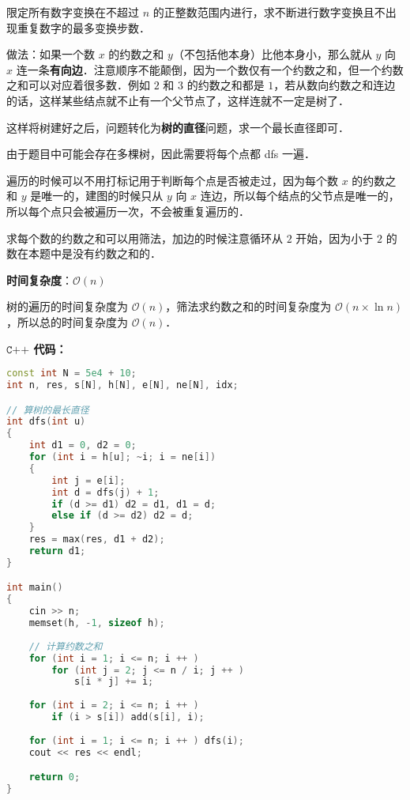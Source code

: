 限定所有数字变换在不超过 $n$ 的正整数范围内进行，求不断进行数字变换且不出现重复数字的最多变换步数．

做法：如果一个数 $x$ 的约数之和 $y$（不包括他本身）比他本身小，那么就从 $y$ 向 $x$ 连一条\textbf{有向边}．注意顺序不能颠倒，因为一个数仅有一个约数之和，但一个约数之和可以对应着很多数．例如 $2$ 和 $3$ 的约数之和都是 $1$，若从数向约数之和连边的话，这样某些结点就不止有一个父节点了，这样连就不一定是树了．

这样将树建好之后，问题转化为\textbf{树的直径}问题，求一个最长直径即可．

由于题目中可能会存在多棵树，因此需要将每个点都 dfs 一遍．

遍历的时候可以不用打标记用于判断每个点是否被走过，因为每个数 $x$ 的约数之和 $y$ 是唯一的，建图的时候只从 $y$ 向 $x$ 连边，所以每个结点的父节点是唯一的，所以每个点只会被遍历一次，不会被重复遍历的．

求每个数的约数之和可以用筛法，加边的时候注意循环从 $2$ 开始，因为小于 $2$ 的数在本题中是没有约数之和的．

\textbf{时间复杂度}：$\mathcal{O}(n)$

树的遍历的时间复杂度为 $\mathcal{O}(n)$，筛法求约数之和的时间复杂度为 $\mathcal{O}(n \times \ln n)$，所以总的时间复杂度为 $\mathcal{O}(n)$．

\textbf{$\texttt{C++}$ 代码：}
\begin{lstlisting}[language=cpp]
const int N = 5e4 + 10;
int n, res, s[N], h[N], e[N], ne[N], idx;

// 算树的最长直径
int dfs(int u)
{
    int d1 = 0, d2 = 0;
    for (int i = h[u]; ~i; i = ne[i])
    {
        int j = e[i];
        int d = dfs(j) + 1;
        if (d >= d1) d2 = d1, d1 = d;
        else if (d >= d2) d2 = d;
    }
    res = max(res, d1 + d2);
    return d1;
}

int main()
{
    cin >> n;
    memset(h, -1, sizeof h);
    
    // 计算约数之和
    for (int i = 1; i <= n; i ++ )
        for (int j = 2; j <= n / i; j ++ )
            s[i * j] += i;
            
    for (int i = 2; i <= n; i ++ )
        if (i > s[i]) add(s[i], i);
        
    for (int i = 1; i <= n; i ++ ) dfs(i);
    cout << res << endl;

    return 0;
}
\end{lstlisting}